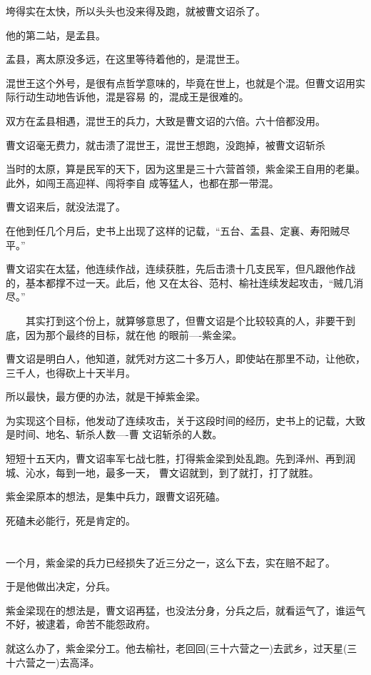 \documentclass[11pt,a4paper,onecolumn]{article}
\begin{document}
垮得实在太快，所以头头也没来得及跑，就被曹文诏杀了。

他的第二站，是孟县。

孟县，离太原没多远，在这里等待着他的，是混世王。

混世王这个外号，是很有点哲学意味的，毕竟在世上，也就是个混。但曹文诏用实际行动生动地告诉他，混是容易
的，混成王是很难的。

双方在孟县相遇，混世王的兵力，大致是曹文诏的六倍。六十倍都没用。

曹文诏毫无费力，就击溃了混世王，混世王想跑，没跑掉，被曹文诏斩杀

当时的太原，算是民军的天下，因为这里是三十六营首领，紫金梁王自用的老巢。此外，如闯王高迎祥、闯将李自
成等猛人，也都在那一带混。

曹文诏来后，就没法混了。

在他到任几个月后，史书上出现了这样的记载，``五台、盂县、定襄、寿阳贼尽平。''

曹文诏实在太猛，他连续作战，连续获胜，先后击溃十几支民军，但凡跟他作战的，基本都撑不过一天。此后，他
又在太谷、范村、榆社连续发起攻击，``贼几消尽。''

　　其实打到这个份上，就算够意思了，但曹文诏是个比较较真的人，非要干到底，因为那个最终的目标，就在他
的眼前----紫金梁。

曹文诏是明白人，他知道，就凭对方这二十多万人，即使站在那里不动，让他砍，三千人，也得砍上十天半月。

所以最快，最方便的办法，就是干掉紫金梁。

为实现这个目标，他发动了连续攻击，关于这段时间的经历，史书上的记载，大致是时间、地名、斩杀人数----曹
文诏斩杀的人数。

短短十五天内，曹文诏率军七战七胜，打得紫金梁到处乱跑。先到泽州、再到润城、沁水，每到一地，最多一天，
曹文诏就到，到了就打，打了就胜。

紫金梁原本的想法，是集中兵力，跟曹文诏死磕。

死磕未必能行，死是肯定的。

\section[\thesection]{}

一个月，紫金梁的兵力已经损失了近三分之一，这么下去，实在赔不起了。

于是他做出决定，分兵。

紫金梁现在的想法是，曹文诏再猛，也没法分身，分兵之后，就看运气了，谁运气不好，被逮着，命苦不能怨政府。

就这么办了，紫金梁分工。他去榆社，老回回(三十六营之一)去武乡，过天星(三十六营之一)去高泽。
\end{document}
